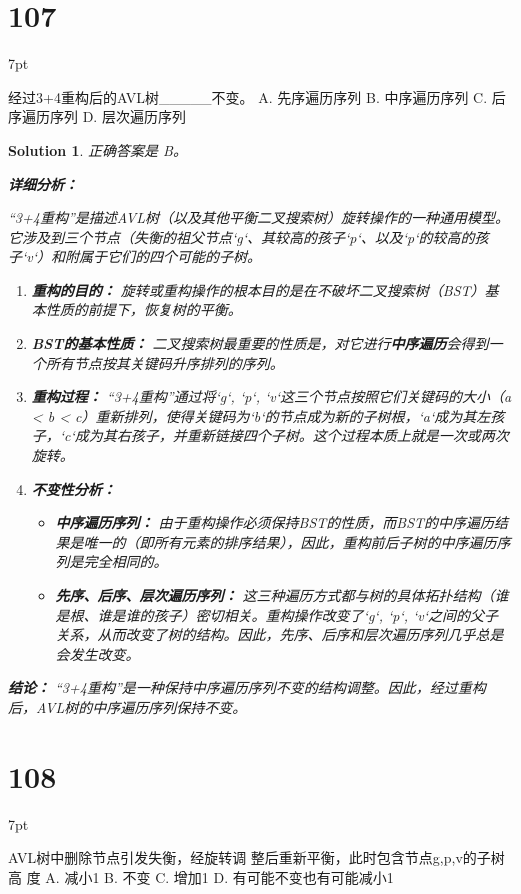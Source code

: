 \documentclass[UTF8]{report}
\newtheorem{solution}{Solution}
\theoremstyle{MyLineTheoremStyle} %
\theoremstyle{MyBlockTheoremStyle} %
\theoremstyle{MySubsubsectionStyle} %
\newenvironment{graybox}{%
        \def\FrameCommand{%
        \hspace{1pt}%
        {\color{gray}\small \vrule width 2pt}%
        {\color{graybox_color}\vrule width 4pt}%
        \colorbox{graybox_color}%
        }%
        \MakeFramed{\advance\hsize-\width\FrameRestore}%
        \noindent\hspace{-4.55pt}%
        \begin{adjustwidth}{}{7pt}%
        \vspace{2pt}\vspace{2pt}%
        }
        {%
        \vspace{2pt}\end{adjustwidth}\endMakeFramed%
        }
\begin{document}
\section*{107}
\begin{graybox}
经过3+4重构后的AVL树\_\_\_\_\_不变。
A. 先序遍历序列
B. 中序遍历序列
C. 后序遍历序列
D. 层次遍历序列
\end{graybox}

\begin{solution}
正确答案是 B。

\textbf{详细分析：}

“3+4重构”是描述AVL树（以及其他平衡二叉搜索树）旋转操作的一种通用模型。它涉及到三个节点（失衡的祖父节点`g`、其较高的孩子`p`、以及`p`的较高的孩子`v`）和附属于它们的四个可能的子树。

\begin{enumerate}
    \item \textbf{重构的目的：} 旋转或重构操作的根本目的是在不破坏二叉搜索树（BST）基本性质的前提下，恢复树的平衡。

    \item \textbf{BST的基本性质：} 二叉搜索树最重要的性质是，对它进行\textbf{中序遍历}会得到一个所有节点按其关键码升序排列的序列。

    \item \textbf{重构过程：} “3+4重构”通过将`g`, `p`, `v`这三个节点按照它们关键码的大小（a < b < c）重新排列，使得关键码为`b`的节点成为新的子树根，`a`成为其左孩子，`c`成为其右孩子，并重新链接四个子树。这个过程本质上就是一次或两次旋转。

    \item \textbf{不变性分析：}
    \begin{itemize}
        \item \textbf{中序遍历序列：} 由于重构操作必须保持BST的性质，而BST的中序遍历结果是唯一的（即所有元素的排序结果），因此，重构前后子树的中序遍历序列是完全相同的。
        \item \textbf{先序、后序、层次遍历序列：} 这三种遍历方式都与树的具体拓扑结构（谁是根、谁是谁的孩子）密切相关。重构操作改变了`g`, `p`, `v`之间的父子关系，从而改变了树的结构。因此，先序、后序和层次遍历序列几乎总是会发生改变。
    \end{itemize}
\end{enumerate}

\textbf{结论：}
“3+4重构”是一种保持中序遍历序列不变的结构调整。因此，经过重构后，AVL树的中序遍历序列保持不变。
\end{solution}


\section*{108}
\begin{graybox}
AVL树中删除节点引发失衡，经旋转调
整后重新平衡，此时包含节点g,p,v的子树高
度
A. 减小1
B. 不变
C. 增加1
D. 有可能不变也有可能减小1
\end{graybox}
\end{document}
